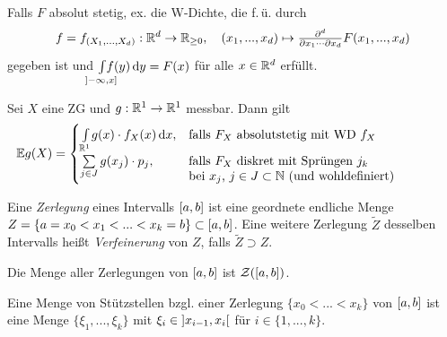 \documentclass{cheat-sheet}
\newcommand{\E}{\mathbb{E}} %
\begin{document}
\begin{bem}
  Falls $F$ absolut stetig, ex. die W-Dichte, die f.\,ü. durch
  \[ f = f_{(X_1, ..., X_d)} : \mathbb{R}^d \to \mathbb{R}_{\geq 0}, \quad (x_1, ..., x_d) \mapsto \tfrac{\partial^d}{\partial x_1 \cdots \partial x_d} F(x_1, ..., x_d) \]
  gegeben ist und $\Int{\mathclap{\ocinterval{-\infty}{x}}}{}{f(y)}{y} = F(x)$ für alle $x \in \mathbb{R}^d$ erfüllt.
\end{bem}


\begin{satz}
  Sei $X$ eine ZG und $g : \mathbb{R}^1 \to \mathbb{R}^1$ messbar. Dann gilt
  \[ \E g(X) = \begin{cases}
    \Int{\R^1}{}{g(x) \cdot f_X(x)}{x}, & \text{falls $F_X$ absolutstetig mit WD $f_X$} \\
    \sum_{j \in J} g(x_j) \cdot p_j, & \parbox[t]{.6\textwidth}{falls $F_X$ diskret mit Sprüngen $j_k$ \\ bei $x_j$, $j \in J \subset \N$ (und wohldefiniert)}
  \end{cases} \]
\end{satz}



\begin{defn}
  Eine \emph{Zerlegung} eines Intervalls $\left[ a, b \right]$ ist eine geordnete endliche Menge $Z = \{ a = x_0 < x_1 < ... < x_k = b\} \subset \left[ a, b \right]$. Eine weitere Zerlegung $\widetilde{Z}$ desselben Intervalls heißt \emph{Verfeinerung} von $Z$, falls $\widetilde{Z} \supset Z$.
\end{defn}

\begin{nota}
  Die Menge aller Zerlegungen von $\left[ a, b \right]$ ist $\mathcal{Z}(\left[ a, b \right])$.
\end{nota}

\begin{defn}
  Eine Menge von Stützstellen bzgl. einer Zerlegung $\{ x_0 < ... < x_k \}$ von $\left[ a, b \right]$ ist eine Menge $\{ \xi_1, ..., \xi_k \}$ mit $\xi_i \in \left] x_{i{-}1}, x_i \right[$ für $i \in \{ 1, ..., k \}$.
\end{defn}
\end{document}
